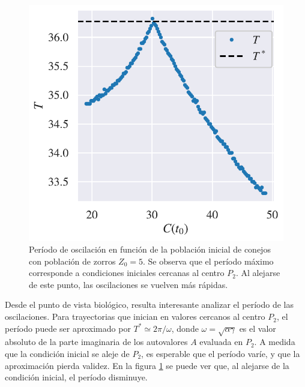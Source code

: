 \documentclass[10pt,twocolumn]{article}
\begin{document}
\begin{figure}[th]
\centering
\includegraphics[scale=0.45]{periodo.pdf}
\caption{\label{fig:periodo} 
Período de oscilación en función de la población inicial de conejos con población de zorros $Z_0 = 5$. Se observa que el período máximo corresponde a condiciones iniciales cercanas al centro $P_2$. Al alejarse de este punto, las oscilaciones se vuelven más rápidas.}
\end{figure}


Desde el punto de vista biológico, resulta interesante analizar el período de las oscilaciones. Para trayectorias que inician en valores cercanos al centro $P_2$, el período puede ser aproximado por $T^* \simeq 2\pi / \omega$, donde $\omega = \sqrt{\alpha \gamma}$ es el valor absoluto de la parte imaginaria de los autovalores $A$ evaluada en $P_2$. 
A medida que la condición inicial se aleje de $P_2$, es esperable que el período varíe, y que la aproximación pierda validez. En la figura \ref{fig:periodo} se puede ver que, al alejarse de la condición inicial, el período disminuye.
\end{document}
